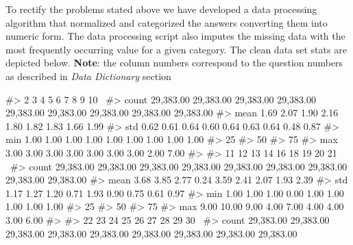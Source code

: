 To rectify the problems stated above we have developed a data processing
algorithm that normalized and categorized the answers converting them
into numeric form. The data processing script also imputes the missing
data with the most frequently occurring value for a given category. The
clean data set stats are depicted below. \textbf{Note}: the column
numbers correspond to the question numbers as described in \emph{Data
Dictionary} section

\begin{Schunk}
\begin{Soutput}
#>               2         3         4         5         6         7         8         9        10  \
#> count 29,383.00 29,383.00 29,383.00 29,383.00 29,383.00 29,383.00 29,383.00 29,383.00 29,383.00   
#> mean       1.69      2.07      1.90      2.16      1.80      1.82      1.83      1.66      1.99   
#> std        0.62      0.61      0.64      0.60      0.64      0.63      0.64      0.48      0.87   
#> min        1.00      1.00      1.00      1.00      1.00      1.00      1.00      1.00      1.00   
#> 25%
#> 50%
#> 75%
#> max        3.00      3.00      3.00      3.00      3.00      3.00      3.00      2.00      7.00   
#> 
#>              11        12        13        14        16        18        19        20        21  \
#> count 29,383.00 29,383.00 29,383.00 29,383.00 29,383.00 29,383.00 29,383.00 29,383.00 29,383.00   
#> mean       3.68      3.85      2.77      0.24      3.59      2.41      2.07      1.93      2.39   
#> std        1.17      1.27      1.20      0.71      1.93      0.90      0.75      0.61      0.97   
#> min        1.00      1.00      1.00      0.00      1.00      1.00      1.00      1.00      1.00   
#> 25%
#> 50%
#> 75%
#> max        9.00     10.00      9.00      4.00      7.00      4.00      4.00      3.00      6.00   
#> 
#>              22        23        24        25        26        27        28        29        30  \
#> count 29,383.00 29,383.00 29,383.00 29,383.00 29,383.00 29,383.00 29,383.00 29,383.00 29,383.00   

\end{Soutput}
\end{Schunk}
